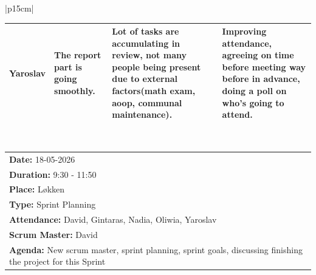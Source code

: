 \begin{table}[H]
    \centering
    \begin{tabular}{|p{15cm}|} 
        \hline
        \begin{table}[H]
            \begin{tabular}{|p{1.75cm}|p{4cm}|p{4cm}|p{4cm}|}
                \hline
                \cellcolor[HTML]{d4d4d4} Yaroslav & The report part is going smoothly. & Lot of tasks are accumulating in review, not many people being present due to external factors(math exam, aoop, communal maintenance). & Improving attendance, agreeing on time before meeting way before in advance, doing a poll on who's going to attend. \\
                \hline
            \end{tabular}
        \end{table}
        \\
        \hline
    \end{tabular}
\end{table}

\begin{table}[H]
    \centering
    \begin{tabular}{|p{15cm}|}   
        \hline
        \textbf{Date:}  18-05-2026 \\
        \textbf{Duration:}  9:30 - 11:50\\
        \textbf{Place:}  Løkken \\
        \textbf{Type:} Sprint Planning \\
        \textbf{Attendance:} David, Gintaras, Nadia, Oliwia, Yaroslav \\
        \textbf{Scrum Master:}  David \\
        \textbf{Agenda:} New scrum master, sprint planning, sprint goals, discussing finishing the project for this Sprint\\
        \hline
    \end{tabular}
\end{table}

